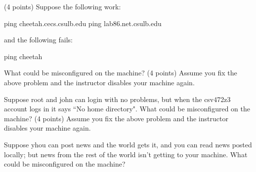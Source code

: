 \ques
(4 points)
Suppose the following work:

{\program
 ping cheetah.cecs.csulb.edu
 ping lab86.net.csulb.edu
\endprogram}

and the following fails:

{\program
 ping cheetah
\endprogram}

What could be misconfigured on the machine?
\vfill
\ques
(4 points)
Assume you fix the above problem and the instructor disables your machine
again.

Suppose root and {\ltt{}john} can login with no problems, but when 
the {\ltt{}csv472z3} account logs in it says ``No home directory".
What could be misconfigured on the machine?
\vfill
\ques
(4 points)
Assume you fix the above problem and the instructor disables your machine
again.

Suppose yhou can post news and the world gets it, and you can read news 
posted locally;
but news from the rest of the world isn't getting to your machine.
What could be misconfigured on the machine?
\bye
